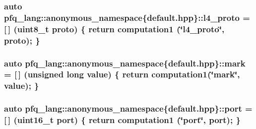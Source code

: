 \hypertarget{namespacepfq__lang_1_1anonymous__namespace_02default_8hpp_03_a75da77904f1cff4cc42fc3a081f80670}{
\subsubsection[{l4\-\_\-proto}]{\setlength{\rightskip}{0pt plus 5cm}auto pfq\-\_\-lang\-::anonymous\-\_\-namespace\{default.\-hpp\}\-::l4\-\_\-proto = \mbox{[}$\,$\mbox{]} (uint8\-\_\-t proto) \{ return {\bf computation1} (\char`\"{}l4\-\_\-proto\char`\"{}, proto); \}}}\label{namespacepfq__lang_1_1anonymous__namespace_02default_8hpp_03_a75da77904f1cff4cc42fc3a081f80670}
\hypertarget{namespacepfq__lang_1_1anonymous__namespace_02default_8hpp_03_ad6142fe3a0fc859f25ea16956f52a5f0}{
\subsubsection[{mark}]{\setlength{\rightskip}{0pt plus 5cm}auto pfq\-\_\-lang\-::anonymous\-\_\-namespace\{default.\-hpp\}\-::mark = \mbox{[}$\,$\mbox{]} (unsigned long value) \{ return {\bf computation1}(\char`\"{}mark\char`\"{}, value); \}}}\label{namespacepfq__lang_1_1anonymous__namespace_02default_8hpp_03_ad6142fe3a0fc859f25ea16956f52a5f0}
\hypertarget{namespacepfq__lang_1_1anonymous__namespace_02default_8hpp_03_a1b370b44e5eedc364f3bb306d5042738}{
\subsubsection[{port}]{\setlength{\rightskip}{0pt plus 5cm}auto pfq\-\_\-lang\-::anonymous\-\_\-namespace\{default.\-hpp\}\-::port = \mbox{[}$\,$\mbox{]} (uint16\-\_\-t port) \{ return {\bf computation1} (\char`\"{}port\char`\"{}, port); \}}}\label{namespacepfq__lang_1_1anonymous__namespace_02default_8hpp_03_a1b370b44e5eedc364f3bb306d5042738}
